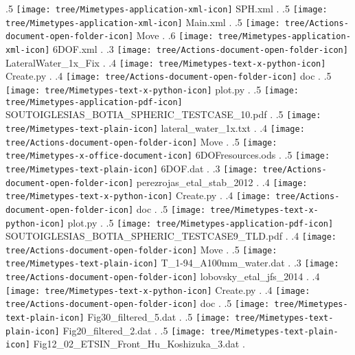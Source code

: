 {.5 { \texttt{[image: tree/Mimetypes-application-xml-icon]} SPH.xml }.
.5 { \texttt{[image: tree/Mimetypes-application-xml-icon]} Main.xml }.
.5 { \texttt{[image: tree/Actions-document-open-folder-icon]} Move }.
.6 { \texttt{[image: tree/Mimetypes-application-xml-icon]} 6DOF.xml }.
.3 { \texttt{[image: tree/Actions-document-open-folder-icon]} LateralWater\_1x\_Fix }.
.4 { \texttt{[image: tree/Mimetypes-text-x-python-icon]} Create.py }.
.4 { \texttt{[image: tree/Actions-document-open-folder-icon]} doc }.
.5 { \texttt{[image: tree/Mimetypes-text-x-python-icon]} plot.py }.
.5 { \texttt{[image: tree/Mimetypes-application-pdf-icon]} SOUTOIGLESIAS\_BOTIA\_SPHERIC\_TESTCASE\_10.pdf }.
.5 { \texttt{[image: tree/Mimetypes-text-plain-icon]} lateral\_water\_1x.txt }.
.4 { \texttt{[image: tree/Actions-document-open-folder-icon]} Move }.
.5 { \texttt{[image: tree/Mimetypes-x-office-document-icon]} 6DOFresources.ods }.
.5 { \texttt{[image: tree/Mimetypes-text-plain-icon]} 6DOF.dat }.
.3 { \texttt{[image: tree/Actions-document-open-folder-icon]} perezrojas\_etal\_stab\_2012 }.
.4 { \texttt{[image: tree/Mimetypes-text-x-python-icon]} Create.py }.
.4 { \texttt{[image: tree/Actions-document-open-folder-icon]} doc }.
.5 { \texttt{[image: tree/Mimetypes-text-x-python-icon]} plot.py }.
.5 { \texttt{[image: tree/Mimetypes-application-pdf-icon]} SOUTOIGLESIAS\_BOTIA\_SPHERIC\_TESTCASE9\_TLD.pdf }.
.4 { \texttt{[image: tree/Actions-document-open-folder-icon]} Move }.
.5 { \texttt{[image: tree/Mimetypes-text-plain-icon]} T\_1-94\_A100mm\_water.dat }.
.3 { \texttt{[image: tree/Actions-document-open-folder-icon]} lobovsky\_etal\_jfs\_2014 }.
.4 { \texttt{[image: tree/Mimetypes-text-x-python-icon]} Create.py }.
.4 { \texttt{[image: tree/Actions-document-open-folder-icon]} doc }.
.5 { \texttt{[image: tree/Mimetypes-text-plain-icon]} Fig30\_filtered\_5.dat }.
.5 { \texttt{[image: tree/Mimetypes-text-plain-icon]} Fig20\_filtered\_2.dat }.
.5 { \texttt{[image: tree/Mimetypes-text-plain-icon]} Fig12\_02\_ETSIN\_Front\_Hu\_Koshizuka\_3.dat }.
}
